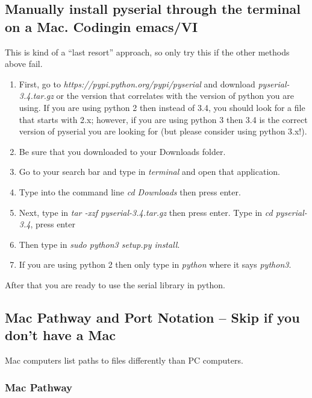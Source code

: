 \subsection{Manually install pyserial through the terminal on a Mac. Codingin emacs/VI}

This is kind of a ``last resort'' approach, so only try this if the other methods above fail.

\begin{enumerate}
	\item First, go to \textit{https://pypi.python.org/pypi/pyserial} and download \textit{pyserial-3.4.tar.gz} or the version that correlates with the version of python you are using. If you are using python 2 then instead of 3.4, you should look for a file that starts with 2.x; however, if you are using python 3 then 3.4 is the correct version of pyserial you are looking for (but please consider using python 3.x!).

	\item Be sure that you downloaded to your Downloads folder.

	\item Go to your search bar and type in \textit{terminal} and open that application.

	\item Type into the command line \textit{cd Downloads} then press enter.

	\item Next, type in \textit{tar -xzf pyserial-3.4.tar.gz} then press enter. Type in \textit{cd pyserial-3.4}, press enter

	\item Then type in \textit{sudo python3 setup.py install}. 

	\item If you are using python 2 then only type in \textit{python} where it says \textit{python3}.
\end{enumerate}

\noindent After that you are ready to use the serial library in python.

\subsection{Mac Pathway and Port Notation -- Skip if you don't have a Mac}

Mac computers list paths to files differently than PC computers.

\subsubsection{Mac Pathway}

